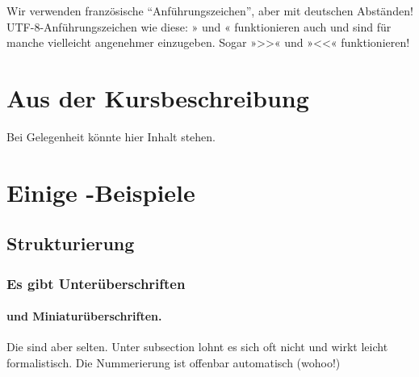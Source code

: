 \documentclass{doku2018}
\begin{document}


Wir verwenden französische "`Anführungszeichen"', aber mit deutschen Abständen!
UTF-8-Anführungszeichen wie diese: » und « funktionieren auch und sind für
manche vielleicht angenehmer einzugeben. Sogar »>>« und »<<« funktionieren!

\section{Aus der Kursbeschreibung}

Bei Gelegenheit könnte hier Inhalt stehen.

\section{Einige -Beispiele}

\subsection{Strukturierung}

\subsubsection{Es gibt Unterüberschriften}

\paragraph{und Miniaturüberschriften.} Die sind aber selten. Unter subsection
lohnt es sich oft nicht und wirkt leicht formalistisch. Die Nummerierung ist
offenbar automatisch (wohoo!)
\end{document}
